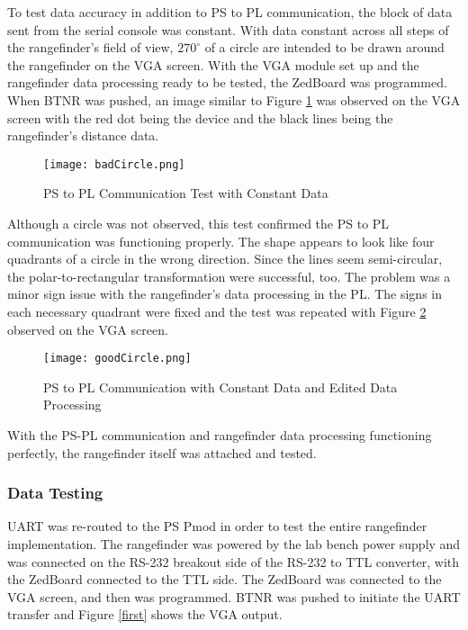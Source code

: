 \par
To test data accuracy in addition to PS to PL communication, the block of data sent from the serial console was constant. With data constant across all steps of the rangefinder's field of view, $270^\circ$ of a circle are intended to be drawn around the rangefinder on the VGA screen. With the VGA module set up and the rangefinder data processing ready to be tested, the ZedBoard was programmed. When BTNR was pushed, an image similar to Figure \ref{badCircle} was observed on the VGA screen with the red dot being the device and the black lines being the rangefinder's distance data.

\begin{figure}[H]
	\centerline{\texttt{[image: badCircle.png]}}
	\caption{PS to PL Communication Test with Constant Data}
	\label{badCircle}
\end{figure}

Although a circle was not observed, this test confirmed the PS to PL communication was functioning properly. The shape appears to look like four quadrants of a circle in the wrong direction. Since the lines seem semi-circular, the polar-to-rectangular transformation were successful, too. The problem was a minor sign issue with the rangefinder's data processing in the PL. The signs in each necessary quadrant were fixed and the test was repeated with Figure \ref{goodCircle} observed on the VGA screen.

\begin{figure}[H]
	\centerline{\texttt{[image: goodCircle.png]}}
	\caption{PS to PL Communication with Constant Data and Edited Data Processing}
	\label{goodCircle}
\end{figure}

With the PS-PL communication and rangefinder data processing functioning perfectly, the rangefinder itself was attached and tested.

\subsubsection{Data Testing}
UART was re-routed to the PS Pmod in order to test the entire rangefinder implementation. The rangefinder was powered by the lab bench power supply and was connected on the RS-232 breakout side of the RS-232 to TTL converter, with the ZedBoard connected to the TTL side. The ZedBoard was connected to the VGA screen, and then was programmed. BTNR was pushed to initiate the UART transfer and Figure \ref{first} shows the VGA output.

